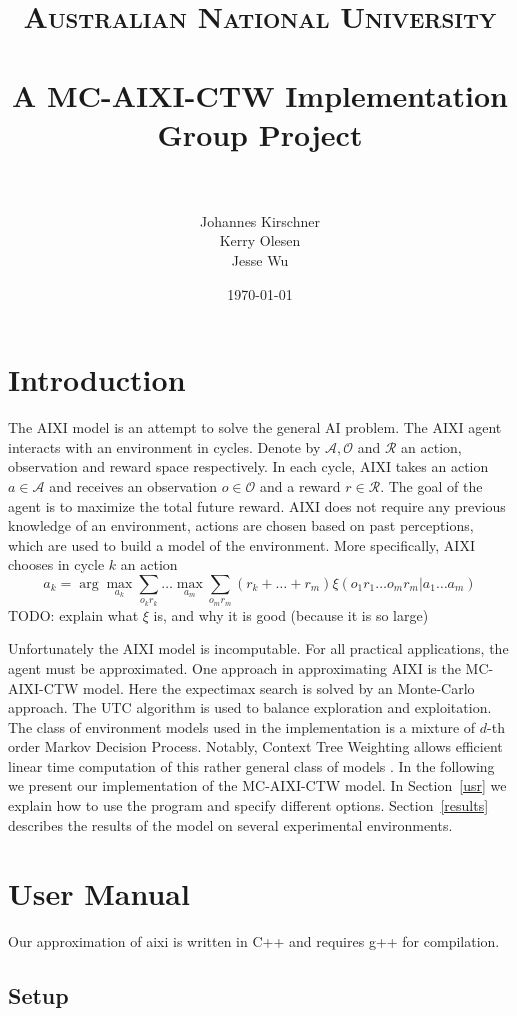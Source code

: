 \documentclass[paper=a4, fontsize=11pt]{scrartcl} %
\title{	
\normalfont \normalsize 
\textsc{Australian National University} \\ [25pt] %
\horrule{0.5pt} \\[0.4cm] %
\huge A MC-AIXI-CTW Implementation\\ Group Project \\ %
\horrule{2pt} \\[0.5cm] %
}
\author{Johannes Kirschner\\ Kerry Olesen\\ Jesse Wu} %
\date{\normalsize\today} %
\numberwithin{equation}{section} %
\numberwithin{figure}{section} %
\numberwithin{table}{section} %
\begin{document}
\maketitle %

\section{Introduction}
The AIXI model \cite{Hutter:04uaibook} is an attempt to solve the general AI problem. The AIXI agent interacts with an environment in cycles. Denote by $\mathcal{A}, \mathcal{O}$ and $\mathcal{R}$ an action, observation and reward space respectively. In each cycle, AIXI takes an action $a \in \mathcal{A}$ and receives an observation $o \in \mathcal{O}$ and a reward $r \in \mathcal{R}$. The goal of the agent is to maximize the total future reward. AIXI does not require any previous knowledge of an environment, actions are chosen based on past perceptions, which are used to build a model of the environment. More specifically, AIXI chooses in cycle $k$ an action
\[ a_k = \arg \max_{a_k} \sum_{o_kr_k} \dots \max_{a_m} \sum_{o_m r_m} (r_k + \dots + r_m)\xi(o_1r_1\dots o_m r_m|a_1\dots a_m) \]
TODO: explain what $\xi$ is, and why it is good (because it is so large)

Unfortunately the AIXI model is incomputable. For all practical applications, the agent must be approximated. One approach in approximating AIXI is the MC-AIXI-CTW \cite{VNHS09} model. Here the expectimax search is solved by an Monte-Carlo approach. The UTC \cite{UCT} algorithm is used to balance exploration and exploitation. The class of environment models used in the implementation is a mixture of $d$-th order Markov Decision Process. Notably, Context Tree Weighting allows efficient linear time computation of this rather general class of models \cite{CTW}.
In the following we present our implementation of the MC-AIXI-CTW model. In Section~\ref{usr} we explain how to use the program and specify different options. Section~\ref{results} describes the results of the model on several experimental environments.


\section{\label{usr}User Manual}

Our approximation of aixi is written in C++ and requires g++ for compilation.

\subsection{Setup}
\end{document}
